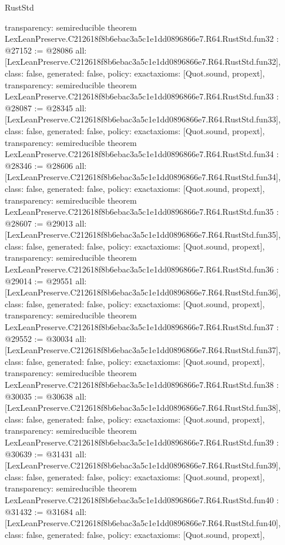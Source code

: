\begin{lexlean}{RustStd}
\begin{coremodule}
{  transparency: semireducible
}
theorem LexLeanPreserve.C212618f8b6ebac3a5c1e1dd0896866e7.R64.RustStd.fun32 : @27152 := @28086 {
  all: [LexLeanPreserve.C212618f8b6ebac3a5c1e1dd0896866e7.R64.RustStd.fun32],
  class: false,
  generated: false,
  policy: exact{axioms: [Quot.sound, propext]},
  transparency: semireducible
}
theorem LexLeanPreserve.C212618f8b6ebac3a5c1e1dd0896866e7.R64.RustStd.fun33 : @28087 := @28345 {
  all: [LexLeanPreserve.C212618f8b6ebac3a5c1e1dd0896866e7.R64.RustStd.fun33],
  class: false,
  generated: false,
  policy: exact{axioms: [Quot.sound, propext]},
  transparency: semireducible
}
theorem LexLeanPreserve.C212618f8b6ebac3a5c1e1dd0896866e7.R64.RustStd.fun34 : @28346 := @28606 {
  all: [LexLeanPreserve.C212618f8b6ebac3a5c1e1dd0896866e7.R64.RustStd.fun34],
  class: false,
  generated: false,
  policy: exact{axioms: [Quot.sound, propext]},
  transparency: semireducible
}
theorem LexLeanPreserve.C212618f8b6ebac3a5c1e1dd0896866e7.R64.RustStd.fun35 : @28607 := @29013 {
  all: [LexLeanPreserve.C212618f8b6ebac3a5c1e1dd0896866e7.R64.RustStd.fun35],
  class: false,
  generated: false,
  policy: exact{axioms: [Quot.sound, propext]},
  transparency: semireducible
}
theorem LexLeanPreserve.C212618f8b6ebac3a5c1e1dd0896866e7.R64.RustStd.fun36 : @29014 := @29551 {
  all: [LexLeanPreserve.C212618f8b6ebac3a5c1e1dd0896866e7.R64.RustStd.fun36],
  class: false,
  generated: false,
  policy: exact{axioms: [Quot.sound, propext]},
  transparency: semireducible
}
theorem LexLeanPreserve.C212618f8b6ebac3a5c1e1dd0896866e7.R64.RustStd.fun37 : @29552 := @30034 {
  all: [LexLeanPreserve.C212618f8b6ebac3a5c1e1dd0896866e7.R64.RustStd.fun37],
  class: false,
  generated: false,
  policy: exact{axioms: [Quot.sound, propext]},
  transparency: semireducible
}
theorem LexLeanPreserve.C212618f8b6ebac3a5c1e1dd0896866e7.R64.RustStd.fun38 : @30035 := @30638 {
  all: [LexLeanPreserve.C212618f8b6ebac3a5c1e1dd0896866e7.R64.RustStd.fun38],
  class: false,
  generated: false,
  policy: exact{axioms: [Quot.sound, propext]},
  transparency: semireducible
}
theorem LexLeanPreserve.C212618f8b6ebac3a5c1e1dd0896866e7.R64.RustStd.fun39 : @30639 := @31431 {
  all: [LexLeanPreserve.C212618f8b6ebac3a5c1e1dd0896866e7.R64.RustStd.fun39],
  class: false,
  generated: false,
  policy: exact{axioms: [Quot.sound, propext]},
  transparency: semireducible
}
theorem LexLeanPreserve.C212618f8b6ebac3a5c1e1dd0896866e7.R64.RustStd.fun40 : @31432 := @31684 {
  all: [LexLeanPreserve.C212618f8b6ebac3a5c1e1dd0896866e7.R64.RustStd.fun40],
  class: false,
  generated: false,
  policy: exact{axioms: [Quot.sound, propext]},
}
\end{coremodule}
\end{lexlean}

